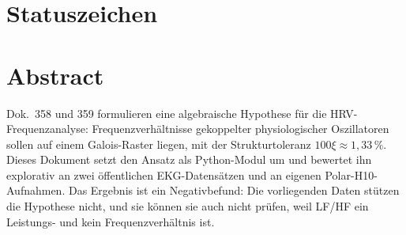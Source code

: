 \providecommand{\BM}{\textbf{[B]}}
\providecommand{\KM}{\textbf{[K]}}
\providecommand{\SM}{\textbf{[S]}}
\providecommand{\XM}{\textbf{[X]}}
\providecommand{\LM}{\textbf{[Q]}}

{}

\section*{Statuszeichen}


\section*{Abstract}

Dok.~358 und 359 formulieren eine algebraische Hypothese für die
HRV-Frequenzanalyse: Frequenzverhältnisse gekoppelter physiologischer
Oszillatoren sollen auf einem Galois-Raster liegen, mit der
Strukturtoleranz $100\xi\approx1{,}33\,\%$. Dieses Dokument setzt den
Ansatz als Python-Modul um und bewertet ihn explorativ an zwei
öffentlichen EKG-Datensätzen und an eigenen Polar-H10-Aufnahmen. Das
Ergebnis ist ein Negativbefund: Die vorliegenden Daten stützen die
Hypothese nicht, und sie können sie auch nicht prüfen, weil LF/HF ein
Leistungs- und kein Frequenzverhältnis ist.

